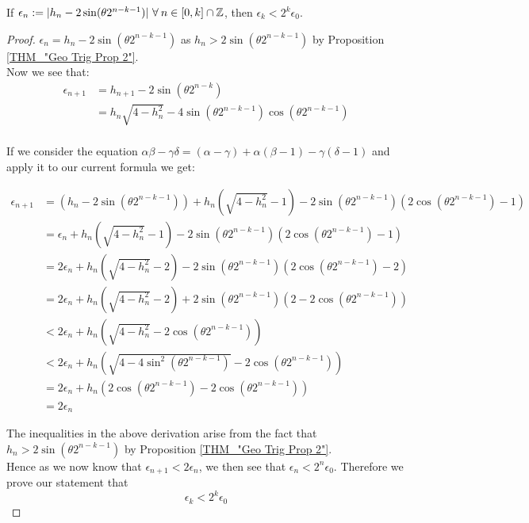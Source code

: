 \begin{Geo Trig Prop 3}
\label{THM_"Geo Trig Prop 3"}
If \(\epsilon_n := |h_n - 2\sin(\theta2^{n-k-1})|\ \forall\: n \in [0,k] \cap \Z\), then \(\epsilon_k < 2^k\epsilon_0\).
\end{Geo Trig Prop 3}
\begin{proof}
\(\epsilon_n = h_n - 2\sin(\theta2^{n-k-1})\) as \(h_n > 2\sin(\theta2^{n-k-1})\) by Proposition \ref{THM_"Geo Trig Prop 2"}.\\

Now we see that:
\begin{displaymath}
\begin{align*}
	\epsilon_{n+1} &= h_{n+1} - 2\sin(\theta2^{n-k})\\
		&= h_n\sqrt{4-h_n^2} 
			- 4\sin(\theta2^{n-k-1})\cos(\theta2^{n-k-1})\\
\end{align*}
\end{displaymath}

If we consider the equation \(\alpha\beta - \gamma\delta = (\alpha - \gamma) + \alpha(\beta - 1) - \gamma(\delta - 1)\) and apply it to our current formula we get:

\begin{displaymath}
\begin{align*}
	\epsilon_{n+1} &= (h_n - 2\sin(\theta2^{n-k-1})) 
						+ h_n(\sqrt{4 - h_n^2} - 1)
						- 2\sin(\theta2^{n-k-1})(2\cos(\theta2^{n-k-1}) - 1)\\
		&= \epsilon_n + h_n(\sqrt{4 - h_n^2} - 1)
			-2\sin(\theta2^{n-k-1})(2\cos(\theta2^{n-k-1}) - 1)\\
		&= 2\epsilon_n + h_n(\sqrt{4 - h_n^2} - 2)
			-2\sin(\theta2^{n-k-1})(2\cos(\theta2^{n-k-1}) - 2)\\
		&= 2\epsilon_n + h_n(\sqrt{4 - h_n^2} - 2)
			+2\sin(\theta2^{n-k-1})(2 - 2\cos(\theta2^{n-k-1}))\\
		&< 2\epsilon_n + h_n(\sqrt{4 - h_n^2} - 2\cos(\theta2^{n-k-1}))\\
		&< 2\epsilon_n + h_n\left(\sqrt{4 - 4\sin^2(\theta2^{n-k-1})}
			- 2\cos(\theta2^{n-k-1})\right)\\
		&= 2\epsilon_n + h_n(2\cos(\theta2^{n-k-1}) 
			- 2\cos(\theta2^{n-k-1}))\\
		&= 2\epsilon_n
\end{align*}
\end{displaymath}

The inequalities in the above derivation arise from the fact that \(h_n > 2\sin(\theta2^{n-k-1})\) by Proposition \ref{THM_"Geo Trig Prop 2"}.\\

Hence as we now know that \(\epsilon_{n+1} < 2\epsilon_n\), we then see that \(\epsilon_n < 2^n\epsilon_0\). Therefore we prove our statement that
\[\epsilon_k < 2^k\epsilon_0\]
\end{proof}

